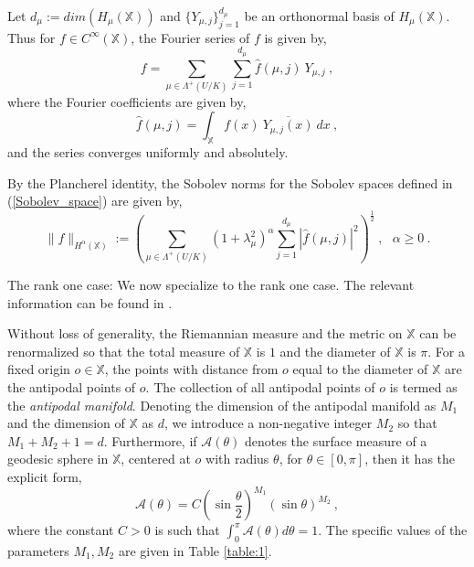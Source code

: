 \documentclass[12pt]{amsart}
\makeatletter
\theoremstyle{definition}
\newcommand{\what}{\widehat}
\newcommand{\Ac}{\mathcal A}%
\newcommand{\X}{\mathbb X}%
\numberwithin{equation}{section}
\renewcommand\subsubsection{\@secnumfont}{\bfseries}%
\renewcommand\subsubsection{\@startsection{subsubsection}{3}
  \z@{.5\linespacing\@plus.7\linespacing}{-.5em}%
  {\normalfont\bfseries}}
\makeatother
\begin{document}
Let $d_\mu :=dim\left(H_\mu(\X)\right)$ and $\{Y_{\mu,j}\}_{j=1}^{d_\mu}$ be an orthonormal basis of $H_\mu(\X)$. Thus for $f \in C^\infty(\X)$, the Fourier series of $f$ is given by,
\begin{equation} \label{Fourier_series}
f=\sum_{\mu \in \Lambda^+(U/K)} \sum_{j=1}^{d_\mu} \what{f}(\mu,j)\:Y_{\mu,j}\:,
\end{equation}
where the Fourier coefficients are given by,
\begin{equation*}
\what{f}(\mu,j) = \int_{\X} f(x)\:\overline{Y_{\mu,j}(x)}\:dx\:,
\end{equation*}
and the series converges uniformly and absolutely. 

By the Plancherel identity, the Sobolev norms for the Sobolev spaces defined in (\ref{Sobolev_space}) are given by,
\begin{equation*}
\|f\|_{H^\alpha(\X)}:=\left(\sum_{\mu \in \Lambda^+(U/K)} {(1+\lambda^2_{\mu})}^\alpha \sum_{j=1}^{d_\mu} \left|\what{f}(\mu,j)\right|^2 \right)^{\frac{1}{2}}\:,\:\:\:\alpha \ge 0\:.
\end{equation*} 


\subsubsection{The rank one case:} We now specialize to the rank one case. The relevant information can be found in \cite{Helgason,CT, Gigante}.

Without loss of generality, the Riemannian measure and the metric on $\X$ can be renormalized so that the total measure of $\X$ is $1$ and the diameter of $\X$ is $\pi$. For a fixed origin $o \in \X$, the points with distance from $o$ equal to the diameter of $\X$ are the antipodal points of $o$. The collection of all antipodal points of $o$ is termed as the {\em antipodal manifold}. Denoting the dimension of the antipodal manifold as $M_1$ and the dimension of $\X$ as $d$, we introduce a non-negative integer $M_2$ so that $M_1+M_2+1=d$. Furthermore, if $\Ac(\theta)$ denotes the surface measure of a geodesic sphere in $\X$, centered at $o$ with radius $\theta$, for $\theta \in [0,\pi]$, then it has the explicit form,
\begin{equation} \label{density}
\Ac(\theta)= C {\left(\sin \frac{\theta}{2}\right)}^{M_1} {(\sin \theta)}^{M_2}\:,
\end{equation}
where the constant $C>0$ is such that $\int_0^\pi \Ac(\theta) d\theta=1$. The specific values of the parameters $M_1,M_2$ are given in Table \ref{table:1}.
 
\end{document}
